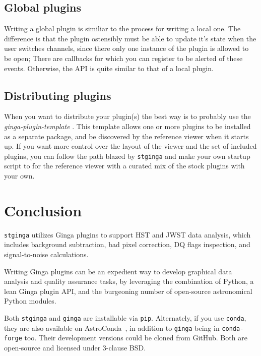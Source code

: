 \documentclass[11pt,twoside]{article}
\begin{document}
\subsection{Global plugins}

Writing a global plugin is similiar to the process for writing a local
one.  The difference is that the plugin ostensibly must be able to
update it's state when the user switches channels, since there only
one instance of the plugin is allowed to be open; There are callbacks
for which you can register to be alerted of these events. Otherwise,
the API is quite similar to that of a local plugin.

\subsection{Distributing plugins}

When you want to distribute your plugin(s) the best way is to probably use
the {\em ginga-plugin-template} \citep*{plugin-template}.
This template allows one
or more plugins to be installed as a separate package, and be
discovered by the reference viewer when it starts up.  If you want
more control over the layout of the viewer and the set of included
plugins, you can follow the path blazed by {\tt stginga} and make your own
startup script to for the reference viewer with a curated mix of the
stock plugins with your own.

\section{Conclusion}

{\tt stginga} utilizes Ginga plugins to support HST and JWST data analysis,
which includes background subtraction, bad pixel correction, DQ flags
inspection, and signal-to-noise calculations.

Writing Ginga plugins can be an expedient way to develop graphical data
analysis and quality assurance tasks, by leveraging the combination of
Python, a lean Ginga plugin API, and the burgeoning number of open-source
astronomical Python modules.

Both {\tt stginga} and {\tt ginga} are installable via {\tt pip}. Alternately,
if you use {\tt conda}, they are also available on AstroConda~\citep{astroconda},
in addition to {\tt ginga} being in  {\tt conda-forge} too. Their development
versions could be cloned from GitHub. Both are open-source and licensed under
3-clause BSD.


\end{document}
